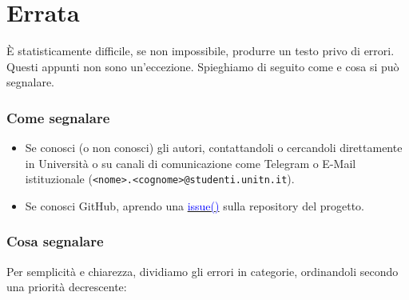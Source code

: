 \section*{Errata}
È statisticamente difficile, se non impossibile, produrre un testo
privo di errori. Questi appunti non sono un'eccezione.
Spieghiamo di seguito come e cosa si può segnalare.

\subsubsection*{Come segnalare}
\begin{itemize}
    \item Se conosci (o non conosci) gli autori, contattandoli o cercandoli direttamente in Università
    o su canali di comunicazione come Telegram o E-Mail istituzionale
    (\texttt{<nome>.<cognome>@studenti.unitn.it}).

    \item Se conosci GitHub, aprendo una \href{https://github.com/zenosaltt/phy/issues}{\textcolor{blue}{issue(\faGithub)}} sulla repository del progetto.

\end{itemize}

\subsubsection*{Cosa segnalare}
Per semplicità e chiarezza, dividiamo gli errori in categorie, ordinandoli secondo una priorità decrescente:

